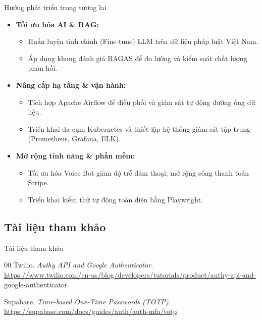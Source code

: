 \begin{frame}{Hướng phát triển trong tương lai}
\begin{itemize}
\item \textbf{Tối ưu hóa AI \& RAG:}
\begin{itemize}
\item Huấn luyện tinh chỉnh (Fine-tune) LLM trên dữ liệu pháp luật Việt Nam.
\item Áp dụng khung đánh giá RAGAS để đo lường và kiểm soát chất lượng phản hồi.
\end{itemize}
\item \textbf{Nâng cấp hạ tầng \& vận hành:}
\begin{itemize}
\item Tích hợp Apache Airflow để điều phối và giám sát tự động đường ống dữ liệu.
\item Triển khai đa cụm Kubernetes và thiết lập hệ thống giám sát tập trung (Prometheus, Grafana, ELK).
\end{itemize}
\item \textbf{Mở rộng tính năng \& phần mềm:}
\begin{itemize}
\item Tối ưu hóa Voice Bot giảm độ trễ đàm thoại; mở rộng cổng thanh toán Stripe.
\item Triển khai kiểm thử tự động toàn diện bằng Playwright.
\end{itemize}
\end{itemize}

\end{frame}

\subsection{Tài liệu tham khảo}
\begin{frame}{Tài liệu tham khảo}
\begin{thebibliography}{00}
Twilio. \textit{Authy API and Google Authenticator}. \\
\url{https://www.twilio.com/en-us/blog/developers/tutorials/product/authy-api-and-google-authenticator}

Supabase. \textit{Time-based One-Time Passwords (TOTP)}. \\
\url{https://supabase.com/docs/guides/auth/auth-mfa/totp}
\end{thebibliography}
\end{frame}

